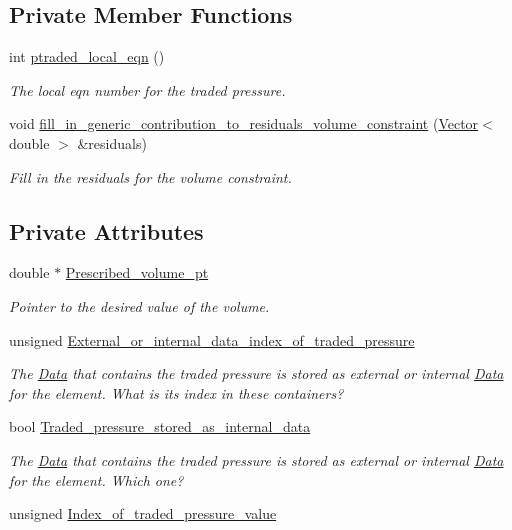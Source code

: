 \subsection*{Private Member Functions}
\begin{DoxyCompactItemize}
\item 
int \hyperlink{classoomph_1_1VolumeConstraintElement_ad0dedf705ccfb713848ad960bf1b901d}{ptraded\+\_\+local\+\_\+eqn} ()
\begin{DoxyCompactList}\small\item\em The local eqn number for the traded pressure. \end{DoxyCompactList}\item 
void \hyperlink{classoomph_1_1VolumeConstraintElement_a1139fafaca2b784c0561457606cc307e}{fill\+\_\+in\+\_\+generic\+\_\+contribution\+\_\+to\+\_\+residuals\+\_\+volume\+\_\+constraint} (\hyperlink{classoomph_1_1Vector}{Vector}$<$ double $>$ \&residuals)
\begin{DoxyCompactList}\small\item\em Fill in the residuals for the volume constraint. \end{DoxyCompactList}\end{DoxyCompactItemize}
\subsection*{Private Attributes}
\begin{DoxyCompactItemize}
\item 
double $\ast$ \hyperlink{classoomph_1_1VolumeConstraintElement_ae109f08c27d29b0749b46285703cb16f}{Prescribed\+\_\+volume\+\_\+pt}
\begin{DoxyCompactList}\small\item\em Pointer to the desired value of the volume. \end{DoxyCompactList}\item 
unsigned \hyperlink{classoomph_1_1VolumeConstraintElement_a51d3b504e02842219a50f043e8cd81f3}{External\+\_\+or\+\_\+internal\+\_\+data\+\_\+index\+\_\+of\+\_\+traded\+\_\+pressure}
\begin{DoxyCompactList}\small\item\em The \hyperlink{classoomph_1_1Data}{Data} that contains the traded pressure is stored as external or internal \hyperlink{classoomph_1_1Data}{Data} for the element. What is its index in these containers? \end{DoxyCompactList}\item 
bool \hyperlink{classoomph_1_1VolumeConstraintElement_ac4275cd18ae758b71ba4191aa2ff9a28}{Traded\+\_\+pressure\+\_\+stored\+\_\+as\+\_\+internal\+\_\+data}
\begin{DoxyCompactList}\small\item\em The \hyperlink{classoomph_1_1Data}{Data} that contains the traded pressure is stored as external or internal \hyperlink{classoomph_1_1Data}{Data} for the element. Which one? \end{DoxyCompactList}\item 
unsigned \hyperlink{classoomph_1_1VolumeConstraintElement_a4f2dd24f0ae52cc665daab425bf94745}{Index\+\_\+of\+\_\+traded\+\_\+pressure\+\_\+value}
\end{DoxyCompactItemize}
